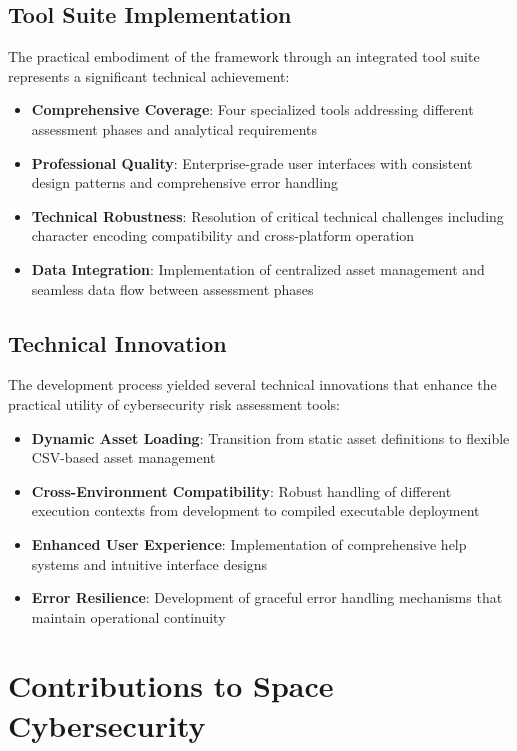 \documentclass[binding=0.6cm]{sapthesis}
\begin{document}
\subsection{Tool Suite Implementation}

The practical embodiment of the framework through an integrated tool suite represents a significant technical achievement:

\begin{itemize}
    \item \textbf{Comprehensive Coverage}: Four specialized tools addressing different assessment phases and analytical requirements
    \item \textbf{Professional Quality}: Enterprise-grade user interfaces with consistent design patterns and comprehensive error handling
    \item \textbf{Technical Robustness}: Resolution of critical technical challenges including character encoding compatibility and cross-platform operation
    \item \textbf{Data Integration}: Implementation of centralized asset management and seamless data flow between assessment phases
\end{itemize}

\subsection{Technical Innovation}

The development process yielded several technical innovations that enhance the practical utility of cybersecurity risk assessment tools:

\begin{itemize}
    \item \textbf{Dynamic Asset Loading}: Transition from static asset definitions to flexible CSV-based asset management
    \item \textbf{Cross-Environment Compatibility}: Robust handling of different execution contexts from development to compiled executable deployment
    \item \textbf{Enhanced User Experience}: Implementation of comprehensive help systems and intuitive interface designs
    \item \textbf{Error Resilience}: Development of graceful error handling mechanisms that maintain operational continuity
\end{itemize}

\section{Contributions to Space Cybersecurity}
\end{document}
